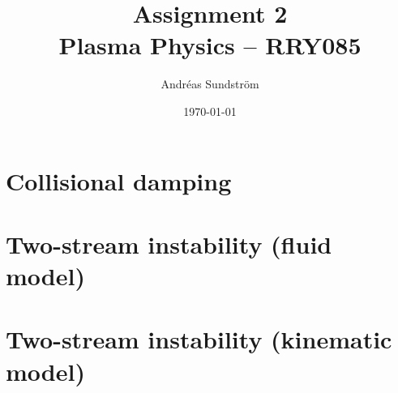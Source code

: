 \documentclass[11pt,a4paper, 
swedish, english %
]{article}
\begin{document}


\title{Assignment 2 \\
{\Large Plasma Physics -- RRY085}}
\author{Andréas Sundström}
\date\today%

\maketitle




\section{Collisional damping}


\section{Two-stream instability (fluid model)}


\section{Two-stream instability (kinematic model)}




\end{document}
